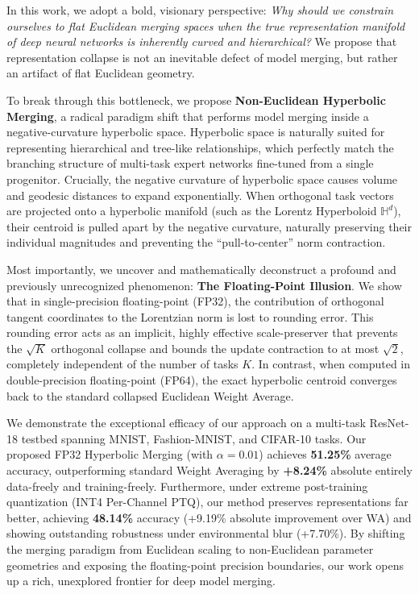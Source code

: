 \documentclass{article}
\theoremstyle{plain}
\theoremstyle{definition}
\theoremstyle{remark}
\begin{document}
In this work, we adopt a bold, visionary perspective: \textit{Why should we constrain ourselves to flat Euclidean merging spaces when the true representation manifold of deep neural networks is inherently curved and hierarchical?} We propose that representation collapse is not an inevitable defect of model merging, but rather an artifact of flat Euclidean geometry. 

To break through this bottleneck, we propose \textbf{Non-Euclidean Hyperbolic Merging}, a radical paradigm shift that performs model merging inside a negative-curvature hyperbolic space. Hyperbolic space is naturally suited for representing hierarchical and tree-like relationships, which perfectly match the branching structure of multi-task expert networks fine-tuned from a single progenitor. Crucially, the negative curvature of hyperbolic space causes volume and geodesic distances to expand exponentially. When orthogonal task vectors are projected onto a hyperbolic manifold (such as the Lorentz Hyperboloid $\mathbb{H}^d$), their centroid is pulled apart by the negative curvature, naturally preserving their individual magnitudes and preventing the ``pull-to-center'' norm contraction.

Most importantly, we uncover and mathematically deconstruct a profound and previously unrecognized phenomenon: \textbf{The Floating-Point Illusion}. We show that in single-precision floating-point (FP32), the contribution of orthogonal tangent coordinates to the Lorentzian norm is lost to rounding error. This rounding error acts as an implicit, highly effective scale-preserver that prevents the $\sqrt{K}$ orthogonal collapse and bounds the update contraction to at most $\sqrt{2}$, completely independent of the number of tasks $K$. In contrast, when computed in double-precision floating-point (FP64), the exact hyperbolic centroid converges back to the standard collapsed Euclidean Weight Average.

We demonstrate the exceptional efficacy of our approach on a multi-task ResNet-18 testbed spanning MNIST, Fashion-MNIST, and CIFAR-10 tasks. Our proposed FP32 Hyperbolic Merging (with $\alpha = 0.01$) achieves \textbf{51.25\%} average accuracy, outperforming standard Weight Averaging by \textbf{+8.24\%} absolute entirely data-freely and training-freely. Furthermore, under extreme post-training quantization (INT4 Per-Channel PTQ), our method preserves representations far better, achieving \textbf{48.14\%} accuracy (+9.19\% absolute improvement over WA) and showing outstanding robustness under environmental blur (+7.70\%). By shifting the merging paradigm from Euclidean scaling to non-Euclidean parameter geometries and exposing the floating-point precision boundaries, our work opens up a rich, unexplored frontier for deep model merging.
\end{document}
